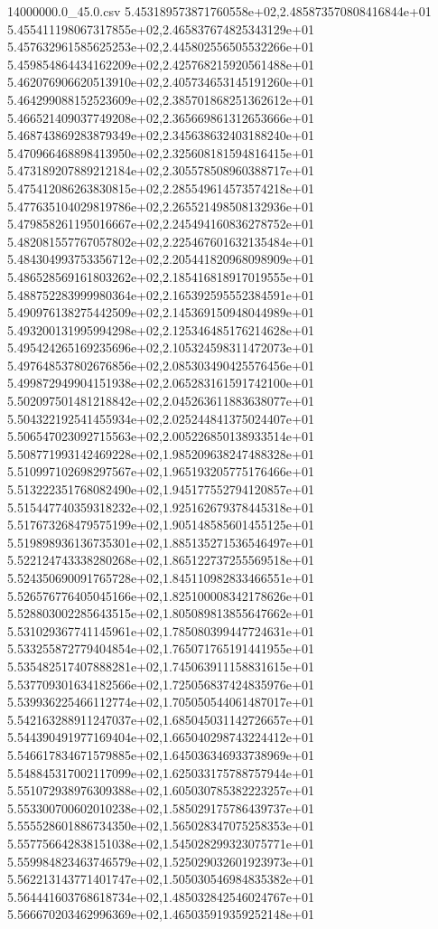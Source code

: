 \begin{filecontents*}{14000000.0_45.0.csv}
5.453189573871760558e+02,2.485873570808416844e+01
5.455411198067317855e+02,2.465837674825343129e+01
5.457632961585625253e+02,2.445802556505532266e+01
5.459854864434162209e+02,2.425768215920561488e+01
5.462076906620513910e+02,2.405734653145191260e+01
5.464299088152523609e+02,2.385701868251362612e+01
5.466521409037749208e+02,2.365669861312653666e+01
5.468743869283879349e+02,2.345638632403188240e+01
5.470966468898413950e+02,2.325608181594816415e+01
5.473189207889212184e+02,2.305578508960388717e+01
5.475412086263830815e+02,2.285549614573574218e+01
5.477635104029819786e+02,2.265521498508132936e+01
5.479858261195016667e+02,2.245494160836278752e+01
5.482081557767057802e+02,2.225467601632135484e+01
5.484304993753356712e+02,2.205441820968098909e+01
5.486528569161803262e+02,2.185416818917019555e+01
5.488752283999980364e+02,2.165392595552384591e+01
5.490976138275442509e+02,2.145369150948044989e+01
5.493200131995994298e+02,2.125346485176214628e+01
5.495424265169235696e+02,2.105324598311472073e+01
5.497648537802676856e+02,2.085303490425576456e+01
5.499872949904151938e+02,2.065283161591742100e+01
5.502097501481218842e+02,2.045263611883638077e+01
5.504322192541455934e+02,2.025244841375024407e+01
5.506547023092715563e+02,2.005226850138933514e+01
5.508771993142469228e+02,1.985209638247488328e+01
5.510997102698297567e+02,1.965193205775176466e+01
5.513222351768082490e+02,1.945177552794120857e+01
5.515447740359318232e+02,1.925162679378445318e+01
5.517673268479575199e+02,1.905148585601455125e+01
5.519898936136735301e+02,1.885135271536546497e+01
5.522124743338280268e+02,1.865122737255569518e+01
5.524350690091765728e+02,1.845110982833466551e+01
5.526576776405045166e+02,1.825100008342178626e+01
5.528803002285643515e+02,1.805089813855647662e+01
5.531029367741145961e+02,1.785080399447724631e+01
5.533255872779404854e+02,1.765071765191441955e+01
5.535482517407888281e+02,1.745063911158831615e+01
5.537709301634182566e+02,1.725056837424835976e+01
5.539936225466112774e+02,1.705050544061487017e+01
5.542163288911247037e+02,1.685045031142726657e+01
5.544390491977169404e+02,1.665040298743224412e+01
5.546617834671579885e+02,1.645036346933738969e+01
5.548845317002117099e+02,1.625033175788757944e+01
5.551072938976309388e+02,1.605030785382223257e+01
5.553300700602010238e+02,1.585029175786439737e+01
5.555528601886734350e+02,1.565028347075258353e+01
5.557756642838151038e+02,1.545028299323075771e+01
5.559984823463746579e+02,1.525029032601923973e+01
5.562213143771401747e+02,1.505030546984835382e+01
5.564441603768618734e+02,1.485032842546024767e+01
5.566670203462996369e+02,1.465035919359252148e+01

\end{filecontents*}
